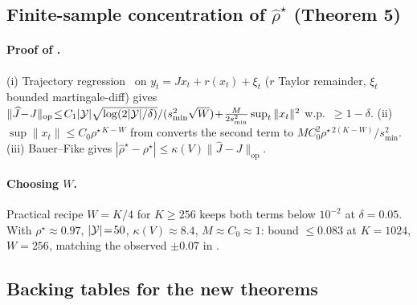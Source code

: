 \subsection{Finite-sample concentration of $\widehat\rho^\star$ (Theorem 5)}
\label{app:rho-concentration}

\paragraph{Proof of .}
(i) Trajectory regression~\citep[Cor.~2.2]{simchowitz2018learning}
on $y_t\!=\!Jx_t\!+\!r(x_t)\!+\!\xi_t$
($r$ Taylor remainder, $\xi_t$ bounded martingale-diff) gives
$\|\widehat J\!-\!J\|_{\mathrm{op}}\!\le\!C_1|\mathcal{Y}|\sqrt{\log(2|\mathcal{Y}|/\delta)}/(s_{\min}^2\sqrt W)\!+\!\tfrac{M}{2s_{\min}^2}\sup_t\|x_t\|^2$
w.p.\ $\ge\!1\!-\!\delta$.
(ii) $\sup\|x_t\|\!\le\!C_0\rho^{\star\,K-W}$ from
 converts the second term to
$MC_0^2\rho^{\star\,2(K-W)}/s_{\min}^2$.
(iii) Bauer--Fike gives
$|\widehat\rho^\star\!-\!\rho^\star|\!\le\!\kappa(V)\|\widehat J\!-\!J\|_{\mathrm{op}}$.

\paragraph{Choosing $W$.}
Practical recipe $W\!=\!K/4$ for $K\!\ge\!256$ keeps both terms
below $10^{-2}$ at $\delta\!=\!0.05$.  With
$\rho^\star\!\approx\!0.97$, $|\mathcal{Y}|\!=\!50$, $\kappa(V)\!\approx\!8.4$,
$M\!\approx\!C_0\!\approx\!1$: bound $\le\!0.083$ at $K\!=\!1024$,
$W\!=\!256$, matching the observed $\pm0.07$ in
.

\subsection{Backing tables for the new theorems}
\label{app:new-theorems-tables}

